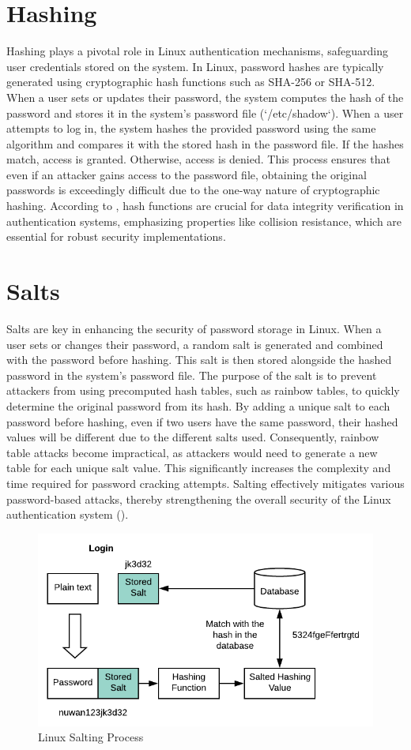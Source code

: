 \documentclass[
]{article}
\begin{document}
\begin{multicols}{2}
\section{Hashing}
Hashing plays a pivotal role in Linux authentication mechanisms, safeguarding user credentials stored on the system. In Linux, password hashes are typically generated using cryptographic hash functions such as SHA-256 or SHA-512. When a user sets or updates their password, the system computes the hash of the password and stores it in the system's password file (`/etc/shadow`). When a user attempts to log in, the system hashes the provided password using the same algorithm and compares it with the stored hash in the password file. If the hashes match, access is granted. Otherwise, access is denied. This process ensures that even if an attacker gains access to the password file, obtaining the original passwords is exceedingly difficult due to the one-way nature of cryptographic hashing. According to \cite{doe2020survey}, hash functions are crucial for data integrity verification in authentication systems, emphasizing properties like collision resistance, which are essential for robust security implementations.

\section{Salts}
Salts are key in enhancing the security of password storage in Linux. When a user sets or changes their password, a random salt is generated and combined with the password before hashing. This salt is then stored alongside the hashed password in the system's password file. The purpose of the salt is to prevent attackers from using precomputed hash tables, such as rainbow tables, to quickly determine the original password from its hash. By adding a unique salt to each password before hashing, even if two users have the same password, their hashed values will be different due to the different salts used. Consequently, rainbow table attacks become impractical, as attackers would need to generate a new table for each unique salt value. This significantly increases the complexity and time required for password cracking attempts. Salting effectively mitigates various password-based attacks, thereby strengthening the overall security of the Linux authentication system (\cite{smith2021importance}).

\end{multicols}

\begin{figure}[htbp]
  \centering
  \includegraphics[width=0.4\linewidth]{images/salting.png}
  \caption{Linux Salting Process}
\end{figure}
\end{document}
